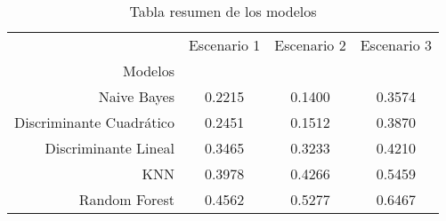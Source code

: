 \begin{table}
\centering
\caption{Tabla resumen de los modelos}
\label{tab:resumen-exp}
\begin{tabular}{rccc}
\toprule
{} &  Escenario 1 &  Escenario 2 &  Escenario 3 \\
Modelos                  &                &                &                \\
\midrule
Naive Bayes              &         0.2215 &         0.1400 &         0.3574 \\
Discriminante Cuadrático &         0.2451 &         0.1512 &         0.3870 \\
Discriminante Lineal     &         0.3465 &         0.3233 &         0.4210 \\
KNN                      &         0.3978 &         0.4266 &         0.5459 \\
Random Forest            &         0.4562 &         0.5277 &         0.6467 \\
\bottomrule
\end{tabular}
\end{table}
